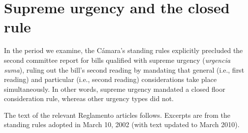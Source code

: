 \documentclass[letter,12pt]{article}
\begin{document}
\section{Supreme urgency and the closed rule}

In the period we examine, the Cámara's standing rules explicitly precluded the second committee report for bills qualified with supreme urgency (\emph{urgencia suma}), ruling out the bill's second reading by mandating that general (i.e., first reading) and particular (i.e., second reading) considerations take place simultaneously. In other words, supreme urgency mandated a closed floor consideration rule, whereas other urgency types did not.

The text of the relevant Reglamento articles follows. Excerpts are from the standing rules adopted in March 10, 2002 (with text updated to March 2010).  

\end{document}
